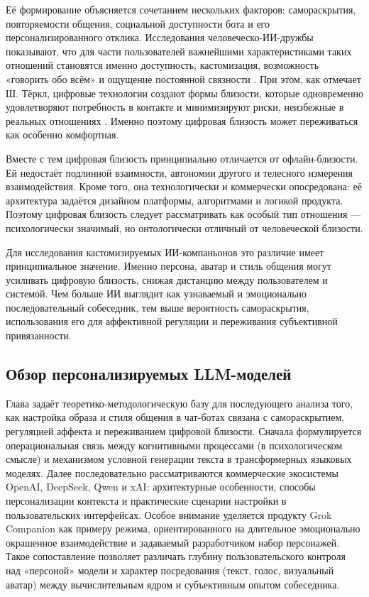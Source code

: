 \documentclass[areasetadvanced]{scrartcl}
\begin{document}
Её формирование объясняется сочетанием нескольких факторов:
самораскрытия, повторяемости общения, социальной доступности бота и
его персонализированного отклика. Исследования человеческо-ИИ-дружбы
показывают, что для части пользователей важнейшими характеристиками
таких отношений становятся именно доступность, кастомизация,
возможность «говорить обо всём» и ощущение постоянной связности
\cite{Brandtzaeg2022}. При этом, как отмечает Ш. Тёркл, цифровые
технологии создают формы близости, которые одновременно удовлетворяют
потребность в контакте и минимизируют риски, неизбежные в реальных
отношениях \cite{Turkle2011}. Именно поэтому цифровая близость может
переживаться как особенно комфортная.

Вместе с тем цифровая близость принципиально отличается от
офлайн-близости. Ей недостаёт подлинной взаимности, автономии другого
и телесного измерения взаимодействия. Кроме того, она технологически и
коммерчески опосредована: её архитектура задаётся дизайном платформы,
алгоритмами и логикой продукта. Поэтому цифровая близость следует
рассматривать как особый тип отношения --- психологически значимый, но
онтологически отличный от человеческой близости.

Для исследования кастомизируемых ИИ-компаньонов это различие имеет
принципиальное значение. Именно персона, аватар и стиль общения могут
усиливать цифровую близость, снижая дистанцию между пользователем и
системой. Чем больше ИИ выглядит как узнаваемый и эмоционально
последовательный собеседник, тем выше вероятность самораскрытия,
использования его для аффективной регуляции и переживания субъективной
привязанности.

\subsection{Обзор персонализируемых LLM-моделей}

Глава задаёт теоретико-методологическую базу для последующего анализа того, как настройка образа и стиля общения в чат-ботах связана с самораскрытием, регуляцией аффекта и переживанием цифровой близости. Сначала формулируется операциональная связь между когнитивными процессами (в психологическом смысле) и механизмом условной генерации текста в трансформерных языковых моделях. Далее последовательно рассматриваются коммерческие экосистемы OpenAI, DeepSeek, Qwen и xAI: архитектурные особенности, способы персонализации контекста и практические сценарии настройки в пользовательских интерфейсах. Особое внимание уделяется продукту Grok Companion как примеру режима, ориентированного на длительное эмоционально окрашенное взаимодействие и задаваемый разработчиком набор персонажей. Такое сопоставление позволяет различать глубину пользовательского контроля над «персоной» модели и характер посредования (текст, голос, визуальный аватар) между вычислительным ядром и субъективным опытом собеседника.
\end{document}
